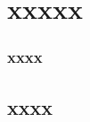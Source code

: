 \documentclass[10pt,letterpaper]{libro-est}
\begin{document}
\part{xxxxx}
\section{xxxx}
\lipsum
\chapter{xxxx}
\lipsum
\newpage
\thispagestyle{plain}
\lipsum
\newpage
\thispagestyle{headings}
\lipsum[1]
\newpage
\lipsum
\end{document}
